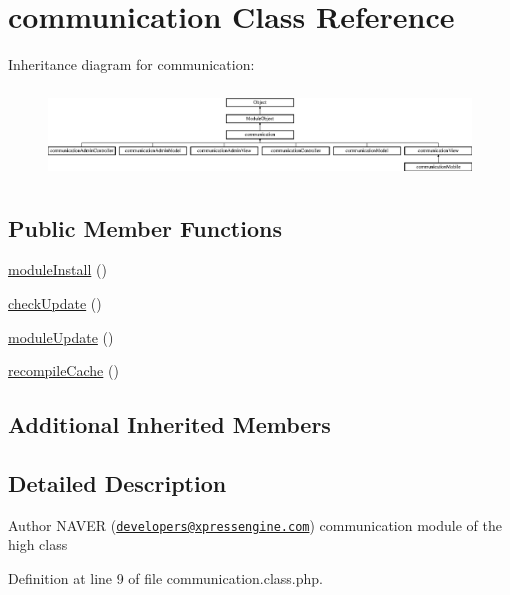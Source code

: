 \hypertarget{classcommunication}{\section{communication Class Reference}
\label{classcommunication}
}
Inheritance diagram for communication\+:\begin{figure}[H]
\begin{center}
\leavevmode
\includegraphics[height=2.405498cm]{classcommunication}
\end{center}
\end{figure}
\subsection*{Public Member Functions}
\begin{DoxyCompactItemize}
\item 
\hyperlink{classcommunication_aa976c35c62e0e28be160893825f4e7a6}{module\+Install} ()
\item 
\hyperlink{classcommunication_a76f080661ce31bd72c02bb41c8d5714f}{check\+Update} ()
\item 
\hyperlink{classcommunication_a10cbff2a979531d279954a22b8455061}{module\+Update} ()
\item 
\hyperlink{classcommunication_a79303a25f2f20a3bdd40f6af4b8f9a52}{recompile\+Cache} ()
\end{DoxyCompactItemize}
\subsection*{Additional Inherited Members}


\subsection{Detailed Description}
\begin{DoxyAuthor}{Author}
N\+A\+V\+E\+R (\href{mailto:developers@xpressengine.com}{\tt developers@xpressengine.\+com}) communication module of the high class 
\end{DoxyAuthor}


Definition at line 9 of file communication.\+class.\+php.



